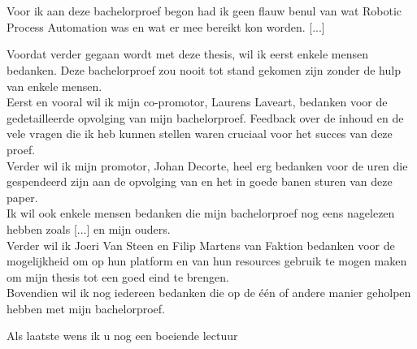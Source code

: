
\chapter*{}
\label{ch:voorwoord}

Voor ik aan deze bachelorproef begon had ik geen flauw benul van wat Robotic Process Automation was en wat er mee bereikt kon worden. [...]

Voordat verder gegaan wordt met deze thesis, wil ik eerst enkele mensen bedanken. Deze bachelorproef zou nooit tot stand gekomen zijn zonder de hulp van enkele mensen.\\
Eerst en vooral wil ik mijn co-promotor, Laurens Laveart, bedanken voor de gedetailleerde
opvolging van mijn bachelorproef. Feedback over de inhoud en de vele vragen die ik heb kunnen stellen waren cruciaal voor het succes van deze proef.\\
Verder wil ik mijn promotor, Johan Decorte, heel erg bedanken voor de uren die
gespendeerd zijn aan de opvolging van en het in goede banen sturen van deze paper.\\
Ik wil ook enkele mensen bedanken die mijn bachelorproef nog eens nagelezen hebben
zoals [...] en mijn ouders.\\
Verder wil ik Joeri Van Steen en Filip Martens van Faktion bedanken voor de mogelijkheid om op hun platform en van hun resources gebruik te mogen maken om mijn thesis tot een goed eind te brengen. \\
Bovendien wil ik nog iedereen bedanken die op de één of andere manier geholpen hebben
met mijn bachelorproef.

Als laatste wens ik u nog een boeiende lectuur

